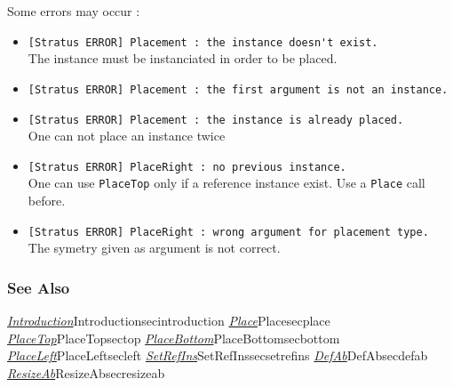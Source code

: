 Some errors may occur :    
\begin{itemize}
    \item \verb-[Stratus ERROR] Placement : the instance doesn't exist.-\\The instance must be instanciated in order to be placed.
    \item \verb-[Stratus ERROR] Placement : the first argument is not an instance.-
    \item \verb-[Stratus ERROR] Placement : the instance is already placed.-\\One can not place an instance twice    
    \item \verb-[Stratus ERROR] PlaceRight : no previous instance.-\\One can use \verb-PlaceTop- only if a reference instance exist. Use a \verb-Place- call before. 
    \item \verb-[Stratus ERROR] PlaceRight : wrong argument for placement type.-\\The symetry given as argument is not correct.
\end{itemize}

\subsubsection{See Also}

\hyperref[ref]{\emph{Introduction}}{}{Introduction}{secintroduction}
\hyperref[ref]{\emph{Place}}{}{Place}{secplace}
\hyperref[ref]{\emph{PlaceTop}}{}{PlaceTop}{sectop}
\hyperref[ref]{\emph{PlaceBottom}}{}{PlaceBottom}{secbottom}
\hyperref[ref]{\emph{PlaceLeft}}{}{PlaceLeft}{secleft}
\hyperref[ref]{\emph{SetRefIns}}{}{SetRefIns}{secsetrefins}
\hyperref[ref]{\emph{DefAb}}{}{DefAb}{secdefab}
\hyperref[ref]{\emph{ResizeAb}}{}{ResizeAb}{secresizeab}
